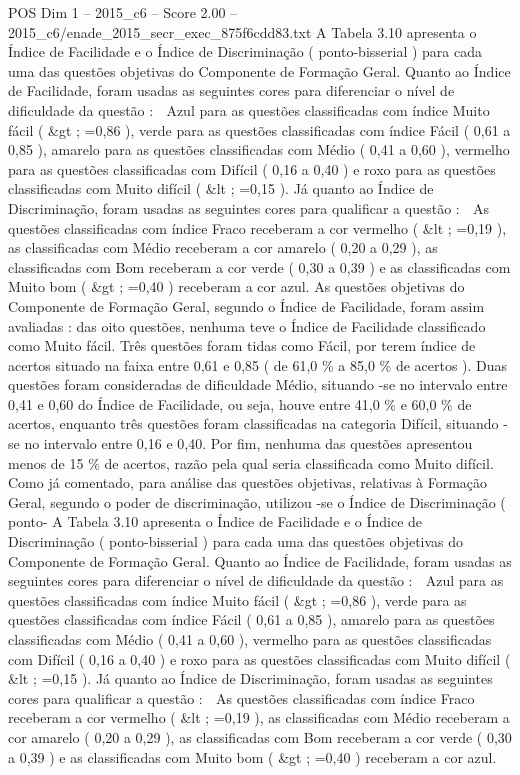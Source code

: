 \begin{textsample}{POS Dim 1 – 2015\_c6 – Score 2.00 – 2015\_c6/enade\_2015\_secr\_exec\_875f6cdd83.txt}
A Tabela 3.10 apresenta o Índice de Facilidade e o Índice de Discriminação ( ponto-bisserial ) para cada uma das questões objetivas do Componente de Formação Geral.
Quanto ao Índice de Facilidade, foram usadas as seguintes cores para diferenciar o nível de dificuldade da questão :  Azul para as questões classificadas com índice Muito fácil ( \&gt ; =0,86 ), verde para as questões classificadas com índice Fácil ( 0,61 a 0,85 ), amarelo para as questões classificadas com Médio ( 0,41 a 0,60 ), vermelho para as questões classificadas com Difícil ( 0,16 a 0,40 ) e roxo para as questões classificadas com Muito difícil ( \&lt ; =0,15 ).
Já quanto ao Índice de Discriminação, foram usadas as seguintes cores para qualificar a questão :  As questões classificadas com índice Fraco receberam a cor vermelho ( \&lt ; =0,19 ), as classificadas com Médio receberam a cor amarelo ( 0,20 a 0,29 ), as classificadas com Bom receberam a cor verde ( 0,30 a 0,39 ) e as classificadas com Muito bom ( \&gt ; =0,40 ) receberam a cor azul.
As questões objetivas do Componente de Formação Geral, segundo o Índice de Facilidade, foram assim avaliadas : das oito questões, nenhuma teve o Índice de Facilidade classificado como Muito fácil.
Três questões foram tidas como Fácil, por terem índice de acertos situado na faixa entre 0,61 e 0,85 ( de 61,0 \% a 85,0 \% de acertos ).
Duas questões foram consideradas de dificuldade Médio, situando -se no intervalo entre 0,41 e 0,60 do Índice de Facilidade, ou seja, houve entre 41,0 \% e 60,0 \% de acertos, enquanto três questões foram classificadas na categoria Difícil, situando -se no intervalo entre 0,16 e 0,40.
Por fim, nenhuma das questões apresentou menos de 15 \% de acertos, razão pela qual seria classificada como Muito difícil.
Como já comentado, para análise das questões objetivas, relativas à Formação Geral, segundo o poder de discriminação, utilizou -se o Índice de Discriminação ( ponto- A Tabela 3.10 apresenta o Índice de Facilidade e o Índice de Discriminação ( ponto-bisserial ) para cada uma das questões objetivas do Componente de Formação Geral.
Quanto ao Índice de Facilidade, foram usadas as seguintes cores para diferenciar o nível de dificuldade da questão :  Azul para as questões classificadas com índice Muito fácil ( \&gt ; =0,86 ), verde para as questões classificadas com índice Fácil ( 0,61 a 0,85 ), amarelo para as questões classificadas com Médio ( 0,41 a 0,60 ), vermelho para as questões classificadas com Difícil ( 0,16 a 0,40 ) e roxo para as questões classificadas com Muito difícil ( \&lt ; =0,15 ).
Já quanto ao Índice de Discriminação, foram usadas as seguintes cores para qualificar a questão :  As questões classificadas com índice Fraco receberam a cor vermelho ( \&lt ; =0,19 ), as classificadas com Médio receberam a cor amarelo ( 0,20 a 0,29 ), as classificadas com Bom receberam a cor verde ( 0,30 a 0,39 ) e as classificadas com Muito bom ( \&gt ; =0,40 ) receberam a cor azul.

\end{textsample}
